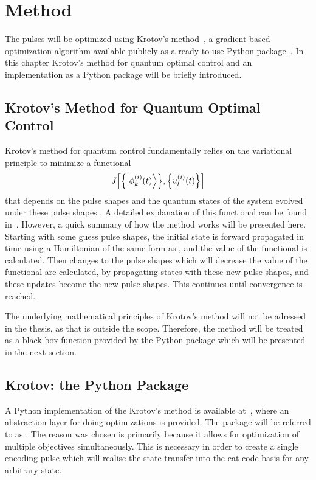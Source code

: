 \documentclass[main.tex]{subfiles}
\begin{document}
\chapter{Method}
The pulses will be optimized using Krotov's method~\cite{reich_monotonically_2012}, a gradient-based optimization algorithm available publicly as a ready-to-use Python package~\cite{goerz_krotov:_2019}.
In this chapter Krotov's method for quantum optimal control and an implementation as a Python package will be briefly introduced.

\section{Krotov's Method for Quantum Optimal Control}
Krotov's method for quantum control fundamentally relies on the variational principle to minimize a functional
\[ J\qty[\qty{\ket{\phi^{(i)}_k(t)}},\qty{u_l^{(i)}(t)}] \]
that depends on the pulse shapes and the quantum states of the system evolved under these pulse shapes \cite{goerz_krotov:_2019}.
A detailed explanation of this functional can be found in~\cite{reich_monotonically_2012}.
However, a quick summary of how the method works will be presented here.
Starting with some guess pulse shapes, the initial state is forward propagated in time using a Hamiltonian of the same form as , and the value of the functional is calculated.
Then changes to the pulse shapes which will decrease the value of the functional are calculated, by propagating states with these new pulse shapes, and these updates become the new pulse shapes.
This continues until convergence is reached.

The underlying mathematical principles of Krotov's method will not be adressed in the thesis, as that is outside the scope.
Therefore, the method will be treated as a black box function provided by the Python package which will be presented in the next section.

\section{Krotov: the Python Package}
A Python implementation of the Krotov's method is available at~\cite{goerz_krotov:_2019}, where an abstraction layer for doing optimizations is provided.
The package will be referred to as \krotov{}.
The reason \krotov{} was chosen is primarily because it allows for optimization of multiple objectives simultaneously.
This is necessary in order to create a single encoding pulse which will realise the state transfer into the cat code basis for any arbitrary state.
\end{document}
